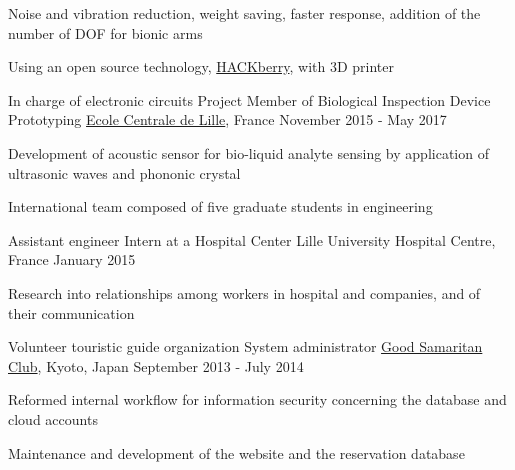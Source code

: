 \documentclass[12pt, a4paper]{cvncl}
\newcommand{\link}[2]{\href{#1}{#2}}
\begin{document}
\begin{cventries}
{\begin{cvitems}
		\item{Noise and vibration reduction, weight saving, faster response, addition of the number of DOF for bionic arms}
		\item{Using an open source technology, \link{http://exiii.jp/eng.html}{HACKberry}, with 3D printer}
	\end{cvitems}}
	\cventry
		{In charge of electronic circuits}
		{Project Member of Biological Inspection Device Prototyping}
		{\link{http://www.ec-lille.fr/en/index.html}{Ecole Centrale de Lille}, France}
		{November 2015 - May 2017}
		{\begin{cvitems}
			\item{Development of acoustic sensor for bio-liquid analyte sensing by application of ultrasonic waves and phononic crystal}
			\item{International team composed of five graduate students in engineering}
		\end{cvitems}}
	\cventry
		{Assistant engineer}
		{Intern at a Hospital Center}
		{Lille University Hospital Centre, France}
		{January 2015}
		{\begin{cvitems}
			\item Research into relationships among workers in hospital and companies, and of their communication
		\end{cvitems}}
\cventry
		{Volunteer touristic guide organization}
		{System administrator}
		{\link{http://goodsamaritanclub.org}{Good Samaritan Club}, Kyoto, Japan}
		{September 2013 - July 2014}
		{\begin{cvitems}
		\item{Reformed internal workflow for information security concerning the database and cloud accounts}
		\item{Maintenance and development of the website and the reservation database}
		\end{cvitems}}
\end{cventries}
\end{document}
